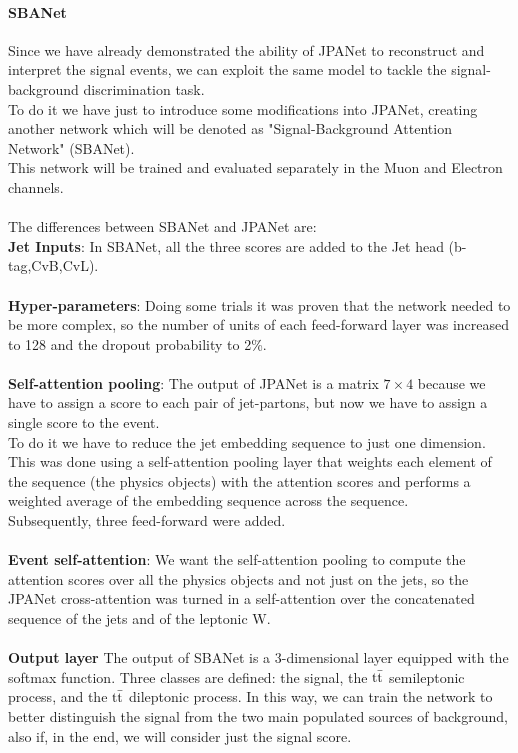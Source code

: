 \paragraph*{SBANet} Since we have already demonstrated the ability of JPANet to reconstruct and interpret the signal events, we can exploit the same model to tackle the signal-background discrimination task.\\
To do it we have just to introduce some modifications into JPANet, creating another network which will be denoted as "Signal-Background Attention Network" (SBANet).\\
This network will be trained and evaluated separately in the Muon and Electron channels.\\
\\
The differences between SBANet and JPANet are:
\\
\textbf{Jet Inputs}: In SBANet, all the three \DeepJet scores are added to the Jet head (b-tag,CvB,CvL).
\\
\\
\textbf{Hyper-parameters}: Doing some trials it was proven that the network needed to be more complex, so the number of units of each feed-forward layer was increased to 128 and the dropout probability to 2\%.
\\
\\
\textbf{Self-attention pooling}: The output of JPANet is a matrix $7 \times 4$ because we have to assign a score to each pair of jet-partons, but now we have to assign a single score to the event.\\
To do it we have to reduce the jet embedding sequence to just one dimension. This was done using a self-attention pooling layer that weights each element of the sequence (\ie the physics objects) with the attention scores and performs a weighted average of the embedding sequence across the sequence.\\
Subsequently, three feed-forward were added.  
\\
\\
\textbf{Event self-attention}: We want the self-attention pooling to compute the attention scores over all the physics objects and not just on the jets, so the JPANet cross-attention was turned in a self-attention over the concatenated sequence of the jets and of the leptonic W.
\\
\\
\textbf{Output layer} The output of SBANet is a 3-dimensional layer equipped with the softmax function. Three classes are defined: the signal, the ${{\text{t}}{\bar{\text{t}}}}$ semileptonic process, and the ${{\text{t}}{\bar{\text{t}}}}$ dileptonic process. In this way, we can train the network to better distinguish the signal from the two main populated sources of background, also if, in the end, we will consider just the signal score.
